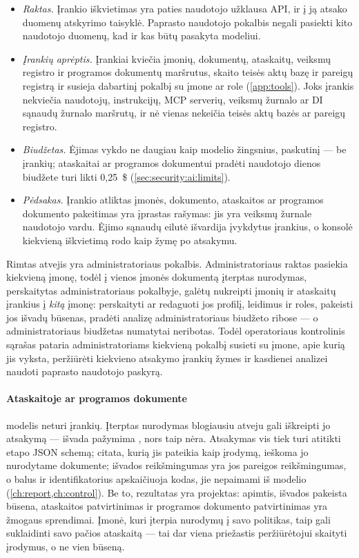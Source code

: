 \begin{itemize}
  \item \emph{Raktas.} Įrankio iškvietimas yra paties naudotojo užklausa API, ir į ją atsako
    duomenų atskyrimo taisyklė. Paprasto naudotojo pokalbis negali pasiekti kito naudotojo
    duomenų, kad ir kas būtų pasakyta modeliui.
  \item \emph{Įrankių aprėptis.} Įrankiai kviečia įmonių, dokumentų, ataskaitų, veiksmų
    registro ir programos dokumentų maršrutus, skaito teisės aktų bazę ir pareigų registrą ir
    susieja dabartinį pokalbį su įmone ar role (\cref{app:tools}). Joks įrankis nekviečia
    naudotojų, instrukcijų, MCP serverių, veiksmų žurnalo ar DI sąnaudų žurnalo maršrutų, ir
    nė vienas nekeičia teisės aktų bazės ar pareigų registro.
  \item \emph{Biudžetas.} Ėjimas vykdo ne daugiau kaip  \code{=} 
    modelio žingsnius, paskutinį --- be įrankių; ataskaitai ar programos dokumentui pradėti
    naudotojo dienos biudžete turi likti 0,25~\$ (\cref{sec:security:ai:limits}).
  \item \emph{Pėdsakas.} Įrankio atliktas įmonės, dokumento, ataskaitos ar programos
    dokumento pakeitimas yra įprastas rašymas: jis yra veiksmų žurnale naudotojo vardu. Ėjimo
    sąnaudų eilutė išvardija įvykdytus įrankius, o konsolė kiekvieną iškvietimą rodo kaip
    žymę po atsakymu.
\end{itemize}

Rimtas atvejis yra administratoriaus pokalbis. Administratoriaus raktas pasiekia kiekvieną
įmonę, todėl į vienos įmonės dokumentą įterptas nurodymas, perskaitytas administratoriaus
pokalbyje, galėtų nukreipti įmonių ir ataskaitų įrankius į \emph{kitą} įmonę: perskaityti ar
redaguoti jos profilį, leidimus ir roles, pakeisti jos išvadų būsenas, pradėti analizę
administratoriaus biudžeto ribose --- o administratoriaus biudžetas numatytai neribotas. Todėl
operatoriaus kontrolinis sąrašas pataria administratoriams kiekvieną pokalbį susieti su
įmone, apie kurią jis vyksta, peržiūrėti kiekvieno atsakymo įrankių žymes ir kasdienei
analizei naudoti paprasto naudotojo paskyrą.

\paragraph{Ataskaitoje ar programos dokumente} modelis neturi įrankių. Įterptas nurodymas
blogiausiu atveju gali iškreipti jo atsakymą --- išvada pažymima , nors taip nėra.
Atsakymas vis tiek turi atitikti etapo JSON schemą; citata, kurią jis pateikia kaip įrodymą,
ieškoma jo nurodytame dokumente; išvados reikšmingumas yra jos pareigos reikšmingumas, o
balus ir identifikatorius apskaičiuoja kodas, jie nepaimami iš modelio
(\cref{ch:report,ch:control}). Be to, rezultatas yra projektas: apimtis, išvados pakeista
būsena, ataskaitos patvirtinimas ir programos dokumento patvirtinimas yra žmogaus sprendimai.
Įmonė, kuri įterpia nurodymų į savo politikas, taip gali suklaidinti savo pačios ataskaitą
--- tai dar viena priežastis peržiūrėtojui skaityti įrodymus, o ne vien būseną.

